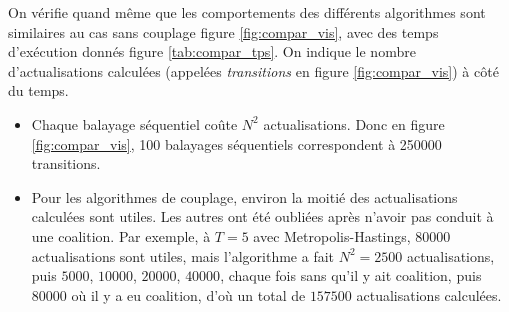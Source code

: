 \documentclass[a4paper,11pt]{article}
\begin{document}
On vérifie quand même que les comportements des différents algorithmes sont similaires au cas sans couplage figure \ref{fig:compar_vis}, avec des temps d'exécution donnés figure \ref{tab:compar_tps}. On indique le nombre d'actualisations calculées (appelées \emph{transitions} en figure \ref{fig:compar_vis}) à côté du temps.
\begin{rk}
\begin{itemize}
	\item Chaque balayage séquentiel coûte $N^2$ actualisations. Donc en figure \ref{fig:compar_vis}, 100 balayages séquentiels correspondent à 250000 transitions.
	\item Pour les algorithmes de couplage, environ la moitié des actualisations calculées sont utiles. Les autres ont été oubliées après n'avoir pas conduit à une coalition. Par exemple, à $T = 5$ avec Metropolis-Hastings, $80000$ actualisations sont utiles, mais l'algorithme a fait $N^2 = 2500$ actualisations, puis $5000$, $10000$, $20000$, $40000$, chaque fois sans qu'il y ait coalition, puis $80000$ où il y a eu coalition, d'où un total de $157500$ actualisations calculées.
\end{itemize}
\end{rk}
\end{document}
